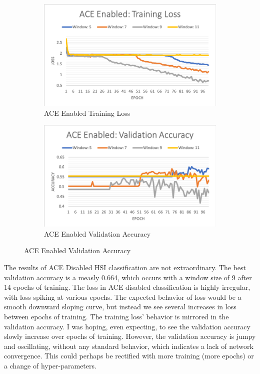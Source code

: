 \documentclass[12pt]{article}
\begin{document}
\begin{figure}[t]
	\begin{subfigure}{0.45\linewidth}
		\includegraphics[width=\linewidth]{ace-enabled-loss.png}
		\caption{ACE Enabled Training Loss}
	\end{subfigure}
	\hfill
	\begin{subfigure}{0.45\linewidth}
		\includegraphics[width=\linewidth]{ace-enabled-valacc.png}
		\caption{ACE Enabled Validation Accuracy}		
	\end{subfigure}
\end{figure}


The results of ACE Disabled HSI classification are not extraordinary.
%
The best validation accuracy is a measly 0.664, which occurs with a window size of 9 after 14 epochs of training.
%
The loss in ACE disabled classification is highly irregular, with loss spiking at various epochs.
%
The expected behavior of loss would be a smooth downward sloping curve, but instead we see several increases in loss between epochs of training.
%
The training loss' behavior is mirrored in the validation accuracy. 
%
I was hoping, even expecting, to see the validation accuracy slowly increase over epochs of training. 
%
However, the validation accuracy is jumpy and oscillating, without any standard behavior, which indicates a lack of network convergence.
%
This could perhaps be rectified with more training (more epochs) or a change of hyper-parameters.
\end{document}
